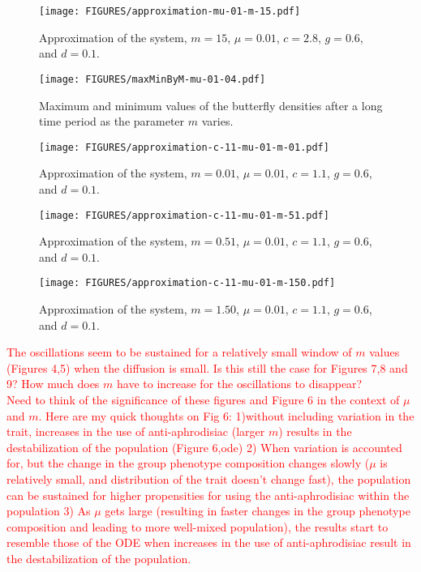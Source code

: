 \documentclass[review,authoryear]{elsarticle}
\begin{document}
\begin{figure}[htb]
  \centering
  \texttt{[image: FIGURES/approximation-mu-01-m-15.pdf]}
  \caption[Approximation with $m=15$ and $\mu=0.01$.]{Approximation of
    the system, $m=15$, $\mu=0.01$, $c=2.8$, $g=0.6$, and $d=0.1$. }
  \label{fig:approximationM15Mu01}
\end{figure}

\begin{figure}[htb]
  \centering
  \texttt{[image: FIGURES/maxMinByM-mu-01-04.pdf]}
  \caption[Maximum and minimum values of the butterfly
  density]{Maximum and minimum values of the butterfly densities after
    a long time period as the parameter $m$ varies.}
  \label{fig:maxMinButterflySmallMu}
\end{figure}

\begin{figure}[htb]
  \centering
  \texttt{[image: FIGURES/approximation-c-11-mu-01-m-01.pdf]}
  \caption[Approximation with $c=1.1$, $m=0.01$ and $\mu=0.01$.]{Approximation of
    the system, $m=0.01$, $\mu=0.01$, $c=1.1$, $g=0.6$, and $d=0.1$. }
  \label{fig:approximationM01Mu01C11}
\end{figure}

\begin{figure}[htb]
  \centering
  \texttt{[image: FIGURES/approximation-c-11-mu-01-m-51.pdf]}
  \caption[Approximation with $c=1.1$, $m=0.51$ and $\mu=0.01$.]{Approximation of
    the system, $m=0.51$, $\mu=0.01$, $c=1.1$, $g=0.6$, and $d=0.1$. }
  \label{fig:approximationM51Mu01C11}
\end{figure}


\begin{figure}[htb]
  \centering
  \texttt{[image: FIGURES/approximation-c-11-mu-01-m-150.pdf]}
  \caption[Approximation with $c=1.1$, $m=1.50$ and $\mu=0.01$.]{Approximation of
    the system, $m=1.50$, $\mu=0.01$, $c=1.1$, $g=0.6$, and $d=0.1$. }
  \label{fig:approximationM150Mu01C11}
\end{figure}
\textcolor{red}{The oscillations seem to be sustained for a relatively small window of $m$ values (Figures 4,5) when the diffusion is small. Is this still the case for Figures 7,8 and 9? How much does $m$ have to increase for the oscillations to disappear? 
\\Need to think of the significance of these figures and Figure 6 in the context of $\mu$ and $m$. Here are my quick thoughts on Fig 6: 1)without including variation in the trait, increases in the use of anti-aphrodisiac (larger $m$) results in the destabilization of the population (Figure 6,ode) 2) When variation is accounted for, but the change in the group phenotype composition changes slowly ($\mu$ is relatively small, and distribution of the trait doesn't change fast), the population can be sustained for higher propensities for using the anti-aphrodisiac within the population 3) As $\mu$ gets large (resulting in faster changes in the group phenotype composition and leading to more well-mixed population), the results start to resemble those of the ODE when increases in the use of anti-aphrodisiac result in the destabilization of the population.  }
\end{document}
